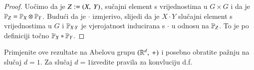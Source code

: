 \begin{proof}
    Uo\v cimo da je $Z:= ({X}, \: {Y})$, su\v cajni element s vrijednostima u $G \times G$ i da je $\mathbb{P}_Z = \mathbb{P}_X \otimes \mathbb{P}_Y$.
    Budu\' ci da je $\cdot$ izmjerivo, slijedi da je $X \cdot Y$ slu\v cajni element s vrijednostima u $G$ i $\mathbb{P}_{X \cdot Y}$ je vjerojatnost inducirana s $\cdot$ u odnosu na $\mathbb{P}_Z$.
    To je po definiciji to\v cno $\mathbb{P}_X * \mathbb{P}_Y$.
\end{proof}

\begin{zad} \label{zad:7.16}
    Primjenite ove rezultate na Abelovu grupu $({\mathbb{R}^d}, \: {+})$ i posebno obratite pa\v znju na slu\v caj $d = 1$.
    Za slu\v caj $d = 1$izvedite pravila za konvluciju d.f.
\end{zad}